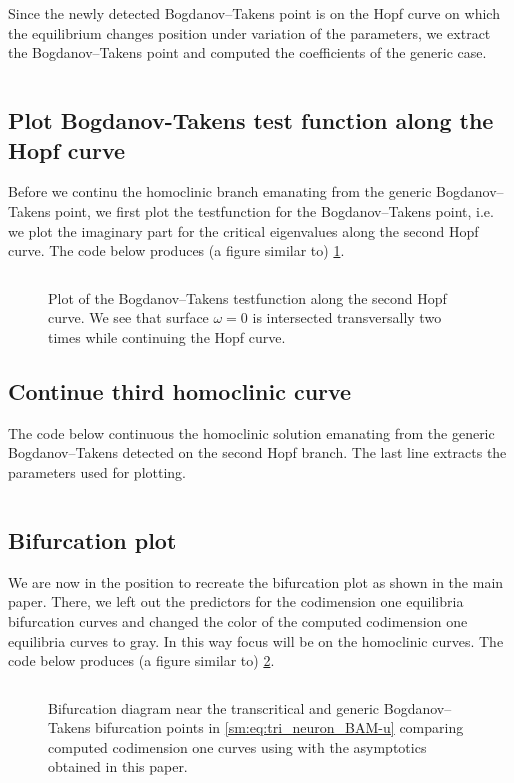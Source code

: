 Since the newly detected Bogdanov--Takens point is on the Hopf curve
on which the equilibrium changes position under variation of the
parameters, we extract the Bogdanov--Takens point and computed the coefficients
of the generic case.
\inputminted[firstline=179, lastline=181]{MATLAB}{\pathToDDEBifToolDemos/BAM_neural_network_model/BAMnn.m}

\subsection{Plot Bogdanov-Takens test function along the Hopf curve}
Before we continu the homoclinic branch emanating from the generic
Bogdanov--Takens point, we first plot the testfunction for the Bogdanov--Takens
point, i.e. we plot the imaginary part for the critical eigenvalues along the
second Hopf curve. The code below produces (a figure similar to)
\cref{sm:fig:triNeuronBAMNeuralNetworkModelTestfunction}.
\inputminted[firstline=185, lastline=197]{MATLAB}{\pathToDDEBifToolDemos/BAM_neural_network_model/BAMnn.m}
%
\begin{figure}[ht]
    \centering
    \caption{Plot of the Bogdanov--Takens testfunction along the second Hopf curve. 
    We see that surface $\omega=0$ is intersected transversally two times
    while continuing the Hopf curve.}
    \label{sm:fig:triNeuronBAMNeuralNetworkModelTestfunction}
\end{figure}

\subsection{Continue third homoclinic curve}
The code below continuous the homoclinic solution emanating from the generic Bogdanov--Takens detected
on the second Hopf branch. The last line extracts the parameters used for plotting.
\inputminted[firstline=199, lastline=205]{MATLAB}{\pathToDDEBifToolDemos/BAM_neural_network_model/BAMnn.m}

\subsection{Bifurcation plot}
We are now in the position to recreate the bifurcation plot as shown in the main paper. There, we
left out the predictors for the codimension one equilibria bifurcation curves and changed the color
of the computed codimension one equilibria curves to gray. In this way focus will be on
the homoclinic curves. The code below produces (a figure similar to)
\cref{sm:fig:triNeuronBAMNeuralNetworkModelCompareParameters}.
\inputminted[firstline=213, lastline=243]{MATLAB}{\pathToDDEBifToolDemos/BAM_neural_network_model/BAMnn.m}
\begin{figure}[ht]
    \caption{
    Bifurcation diagram near the transcritical and generic Bogdanov--Takens
    bifurcation points in \cref{sm:eq:tri_neuron_BAM-u} comparing computed
    codimension one curves using \DDEBIFTOOL with the asymptotics obtained in this
    paper.}
    \label{sm:fig:triNeuronBAMNeuralNetworkModelCompareParameters}
\end{figure}

